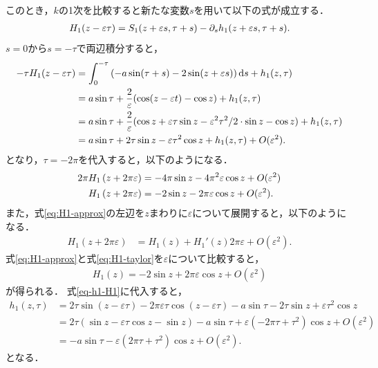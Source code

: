\documentclass[../main]{subfiles}
\begin{document}
    このとき，$k$の1次を比較すると新たな変数$s$を用いて以下の式が成立する．
    \begin{align}
        H_1(z-\varepsilon \tau)=S_1(z+\varepsilon s,\tau+s)-\partial_s h_1(z+\varepsilon s,\tau+s).
    \end{align}
    $s=0$から$s=-\tau$で両辺積分すると，
    \begin{align}
        -\tau H_1(z-\varepsilon \tau)&=\int_0^{-\tau}\left(-a\sin(\tau+s)-2\sin(z+\varepsilon s)\right)\dd{s}+h_1(z,\tau)\notag \\
        &=a \sin\tau+\frac{2}{\varepsilon}(\cos (z-\varepsilon t)-\cos  z)+h_1(z,\tau)\notag\\
        &=a \sin\tau+\frac{2}{\varepsilon}(\cos z+\varepsilon \tau\sin z-\varepsilon^2\tau^2/2\cdot\sin z-\cos z)+h_1(z,\tau)\notag\\
        &=a \sin\tau+2\tau\sin z-\varepsilon \tau^2\cos z+h_1(z,\tau)+O(\varepsilon^2).
        \label{eq-h1-H1}
    \end{align}
    となり，$\tau=-2\pi$を代入すると，以下のようになる．
    \begin{align}
        2\pi H_1\left(z+ 2\pi\varepsilon\right)&=-4\pi\sin z-4\pi^2\varepsilon \cos z+O(\varepsilon^2)\notag\\
        H_1\left(z+2\pi\varepsilon\right)&=-2 \sin z-2\pi\varepsilon \cos z+O(\varepsilon^2).\label{eq:H1-approx}
    \end{align}
    また，式\eqref{eq:H1-approx}の左辺を$z$まわりに$\varepsilon$について展開すると，以下のようになる．
    \begin{align}
        H_1\left(z+2\pi\varepsilon\right)&=H_1(z)+H_1'(z) 2\pi\varepsilon+O(\varepsilon^2).
        \label{eq:H1-taylor}
    \end{align}
    式\eqref{eq:H1-approx}と式\eqref{eq:H1-taylor}を$\varepsilon$について比較すると，
    \begin{align}
        \label{eq:nit-H1}
        H_1(z)=-2\sin z+2\pi\varepsilon \cos z+O(\varepsilon^2)
    \end{align}
    が得られる．
    式\eqref{eq-h1-H1}に代入すると，
    \begin{align*}
        h_1(z,\tau)&=2\tau\sin(z-\varepsilon \tau)-2\pi\varepsilon \tau\cos(z-\varepsilon \tau)-a\sin\tau-2\tau\sin z+\varepsilon \tau^2\cos z\\
        &=2\tau(\sin z-\varepsilon \tau\cos z-\sin z)-a\sin\tau+\varepsilon(-2\pi \tau+\tau^2)\cos z+O(\varepsilon^2)\\
        &=-a\sin\tau-\varepsilon(2\pi \tau+\tau^2)\cos z+O(\varepsilon^2).
    \end{align*}
    となる．
\end{document}
